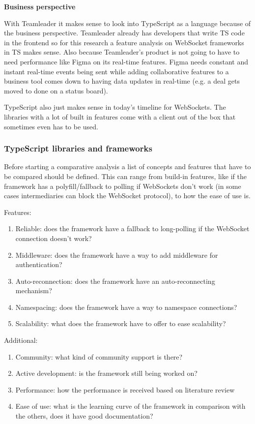 \textbf{Business perspective}

With Teamleader it makes sense to look into TypeScript as a language because of the business perspective. Teamleader already has developers that write TS code in the frontend so for this research a feature analysis on WebSocket frameworks in TS makes sense. Also because Teamleader's product is not going to have to need performance like Figma on its real-time features. Figma needs constant and instant real-time events being sent while adding collaborative features to a business tool comes down to having data updates in real-time (e.g. a deal gets moved to done on a status board).

TypeScript also just makes sense in today's timeline for WebSockets. The libraries with a lot of built in features come with a client out of the box that sometimes even has to be used.

\subsubsection{TypeScript libraries and frameworks}

Before starting a comparative analysis a list of concepts and features that have to be compared should be defined. This can range from build-in features, like if the framework has a polyfill/fallback to polling if WebSockets don't work (in some cases intermediaries can block the WebSocket protocol), to how the ease of use is.

Features:

\begin{enumerate}
  \item Reliable: does the framework have a fallback to long-polling if the WebSocket connection doesn't work?
  \item Middleware: does the framework have a way to add middleware for authentication?
  \item Auto-reconnection: does the framework have an auto-reconnecting mechanism?
  \item Namespacing: does the framework have a way to namespace connections?
  \item Scalability: what does the framework have to offer to ease scalability?
\end{enumerate}

Additional:

\begin{enumerate}
  \item Community: what kind of community support is there?
  \item Active development: is the framework still being worked on?
  \item Performance: how the performance is received based on literature review
  \item Ease of use: what is the learning curve of the framework in comparison with the others, does it have good documentation?
\end{enumerate}

